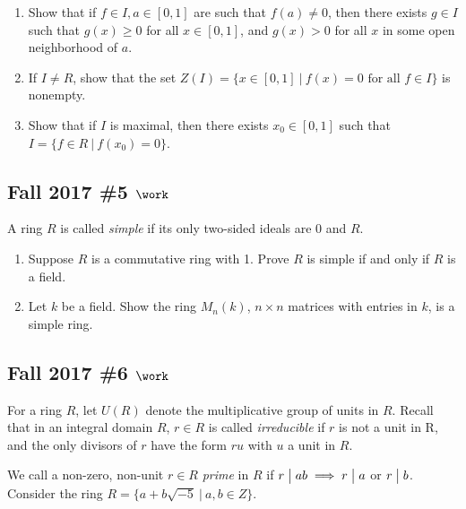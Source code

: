 \begin{enumerate}
\def\labelenumi{\alph{enumi}.}
\item
  Show that if \(f \in I, a \in [0, 1]\) are such that \(f (a) \neq 0\),
  then there exists \(g \in I\) such that \(g(x) \geq 0\) for all
  \(x \in [0, 1]\), and \(g(x) > 0\) for all \(x\) in some open
  neighborhood of \(a\).
\item
  If \(I \neq R\), show that the set
  \(Z(I) = \{x \in [0, 1] {~\mathrel{\Big|}~}f(x) = 0 \text{ for all } f \in I\}\)
  is nonempty.
\item
  Show that if \(I\) is maximal, then there exists \(x_0 \in [0, 1]\)
  such that \(I = \{ f \in R {~\mathrel{\Big|}~}f (x_0 ) = 0\}\).
\end{enumerate}

\hypertarget{fall-2017-5-work}{%
\subsection{\texorpdfstring{Fall 2017 \#5
\(\work\)}{Fall 2017 \#5 \textbackslash work}}\label{fall-2017-5-work}}

A ring \(R\) is called \emph{simple} if its only two-sided ideals are
\(0\) and \(R\).

\begin{enumerate}
\def\labelenumi{\alph{enumi}.}
\item
  Suppose \(R\) is a commutative ring with 1. Prove \(R\) is simple if
  and only if \(R\) is a field.
\item
  Let \(k\) be a field. Show the ring \(M_n (k)\), \(n \times n\)
  matrices with entries in \(k\), is a simple ring.
\end{enumerate}

\hypertarget{fall-2017-6-work}{%
\subsection{\texorpdfstring{Fall 2017 \#6
\(\work\)}{Fall 2017 \#6 \textbackslash work}}\label{fall-2017-6-work}}

For a ring \(R\), let \(U(R)\) denote the multiplicative group of units
in \(R\). Recall that in an integral domain \(R\), \(r \in R\) is called
\emph{irreducible} if \(r\) is not a unit in R, and the only divisors of
\(r\) have the form \(ru\) with \(u\) a unit in \(R\).

We call a non-zero, non-unit \(r \in R\) \emph{prime} in \(R\) if
\(r \bigm|ab \implies r \bigm|a\) or \(r \bigm|b\). Consider the ring
\(R = \{a + b \sqrt{-5}{~\mathrel{\Big|}~}a, b \in Z\}\).

